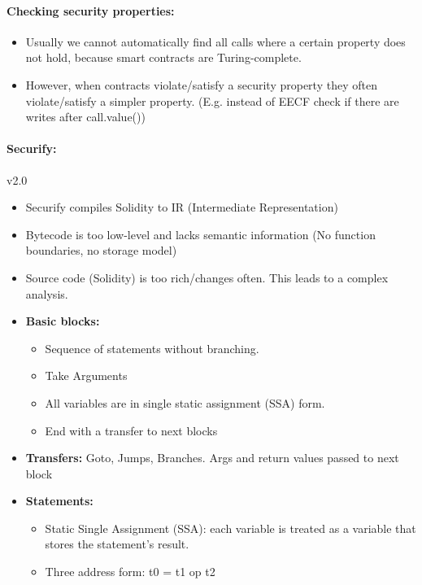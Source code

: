 \paragraph{Checking security properties:}
\begin{itemize}
    \item Usually we cannot automatically find all calls where a certain property does not hold, because smart contracts are Turing-complete.
    \item However, when contracts violate/satisfy a security property they often violate/satisfy a simpler property. (E.g. instead of EECF check if there are writes after call.value())
\end{itemize}{}

\paragraph{Securify: } v2.0

\begin{minipage}{0.9\linewidth}
    \centering      
    \def\svgwidth{\linewidth}
        
\end{minipage}

\begin{itemize}
    \item Securify compiles Solidity to IR (Intermediate Representation)
    \item Bytecode is too low-level and lacks semantic information (No function boundaries, no storage model)
    \item Source code (Solidity) is too rich/changes often. This leads to a complex analysis.
    \item \textbf{Basic blocks: }
    \begin{itemize}
        \item Sequence of statements without branching.
        \item Take Arguments
        \item All variables are in single static assignment (SSA) form.
        \item End with a transfer to next blocks
    \end{itemize}{}
    \item \textbf{Transfers:} Goto, Jumps, Branches. Args and return values passed to next block
    \item \textbf{Statements:} 
    \begin{itemize}
        \item Static Single Assignment (SSA): each variable is treated as a variable that stores the statement's result.
        \item Three address form: t0 = t1 op t2
    \end{itemize}{}
\end{itemize}{}

